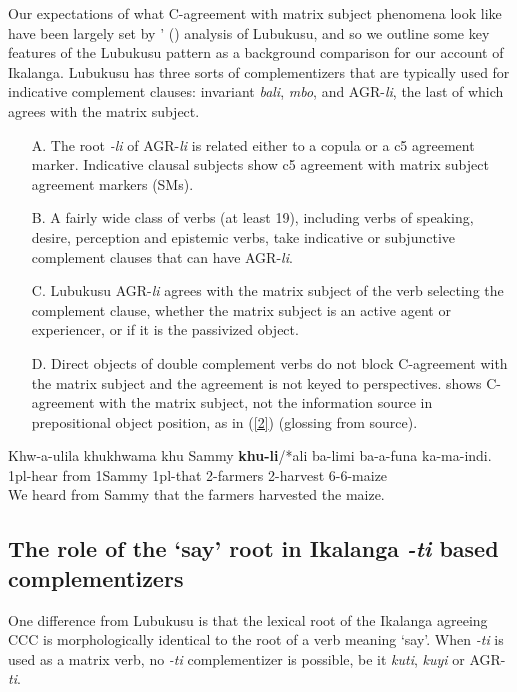 \documentclass[output=paper,
modfonts
]{langscibook}
\begin{document}
Our expectations of what C-agreement with matrix subject phenomena look like have been largely set by \citeauthor{Diercks2013}' (\citeyear{Diercks2013}) analysis of Lubukusu, and so we outline some key features of the Lubukusu pattern as a background comparison for our account of Ikalanga. Lubukusu has three sorts of complementizers that are typically used for indicative complement clauses: invariant \textit{bali}, \textit{mbo}, and AGR-\textit{li}, the last of which agrees with the matrix subject. 
\begin{enumerate}
\item[A.] The root \textit{-li} of AGR-\textit{li} is related either to a copula or a c5 agreement marker. Indicative clausal subjects show c5 agreement with matrix subject agreement markers (SMs). 
\item[B.] A fairly wide class of verbs (at least 19), including verbs of speaking, desire, perception and epistemic verbs, take indicative or subjunctive complement clauses that can have AGR-\textit{li}. 
\item[C.] Lubukusu AGR-\textit{li} agrees with the matrix subject of the verb selecting the complement clause, whether the matrix subject is an active agent or experiencer, or if it is the passivized object.
\item[D.] Direct objects of double complement verbs do not block C-agreement with the matrix subject and the agreement is not keyed to perspectives. \citet{Diercks2013} shows C-agreement with the matrix subject, not the information source in prepositional object position, as in (\ref{2}) (glossing from source).
\end{enumerate}

\ea \label{2}
\gll Khw-a-ulila  khukhwama khu Sammy  \textbf{khu-li}/*ali ba-limi   ba-a-funa ka-ma-indi. \\
1pl-hear from   1Sammy 1pl-that  2-farmers 2-harvest 6-6-maize \\
\glt We heard from Sammy that the farmers harvested the maize.
\z

\subsection{The role of the `say' root in Ikalanga \textit{-ti} based complementizers}

One difference from Lubukusu is that the lexical root of the Ikalanga agreeing CCC is morphologically identical to the root of a verb meaning ‘say’. When \textit{-ti} is used as a matrix verb, no \textit{-ti}  complementizer is possible, be it \textit{kuti}, \textit{kuyi} or AGR-\textit{ti}.
\end{document}
